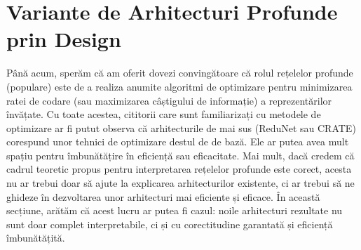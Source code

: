 \documentclass[../../book-main_ro.tex]{subfiles}
\begin{document}
\begin{table*}[t!]
\centering
\caption{\small Acuratețea de clasificare top-1 a \textsc{crate} pe diferite seturi de date cu diferite scale de model
când este pre-antrenat pe ImageNet-1K. Pentru ImageNet-1K/ImageNet-1K ReaL, evaluăm direct acuratețea top-1. Pentru alte seturi de date, folosim modele care sunt pre-antrenate pe ImageNet ca inițializare și evaluăm performanța de învățare prin transfer prin ajustare fină.}
\label{tab:crate_comparison_with_sota}
\small
    \setlength{\tabcolsep}{13.6pt}
\end{table*}



\section{Variante de Arhitecturi Profunde prin Design} \label{sec:chap4-derive-white-box-transformer-variants}

Până acum, sperăm că am oferit dovezi convingătoare că rolul rețelelor profunde (populare) este de a realiza anumite algoritmi de optimizare pentru minimizarea ratei de codare (sau maximizarea câștigului de informație) a reprezentărilor învățate. Cu toate acestea, cititorii care sunt familiarizați cu metodele de optimizare ar fi putut observa că arhitecturile de mai sus (ReduNet sau CRATE) corespund unor tehnici de optimizare destul de de bază. Ele ar putea avea mult spațiu pentru îmbunătățire în eficiență sau eficacitate. Mai mult, dacă credem că cadrul teoretic propus pentru interpretarea rețelelor profunde este corect, acesta nu ar trebui doar să ajute la explicarea arhitecturilor existente, ci ar trebui să ne ghideze în dezvoltarea unor arhitecturi mai eficiente și eficace. În această secțiune, arătăm că acest lucru ar putea fi cazul: noile arhitecturi rezultate nu sunt doar complet interpretabile, ci și cu corectitudine garantată și eficiență îmbunătățită.
\end{document}
